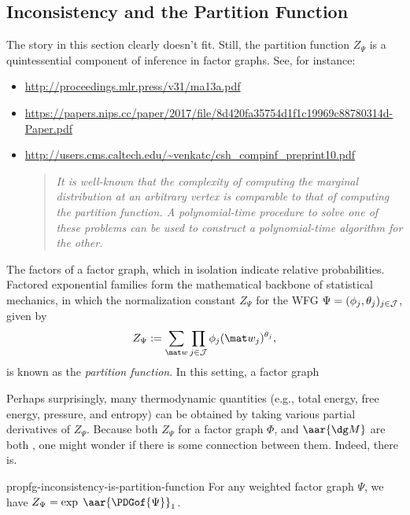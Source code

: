 \subsection{Inconsistency and the Partition Function}
\begin{storynote}
	The story in this section clearly doesn't fit. Still, the partition function $Z_\Psi$ is a quintessential component of inference in factor graphs. See, for instance:
	\begin{itemize}[nosep]
		\item \url{http://proceedings.mlr.press/v31/ma13a.pdf}
		\item {\small\url{https://papers.nips.cc/paper/2017/file/8d420fa35754d1f1c19969c88780314d-Paper.pdf}}
		\item \url{http://users.cms.caltech.edu/~venkatc/csh_compinf_preprint10.pdf}
		\begin{quotation} \small\it\noindent
			It is well-known that the complexity of computing the marginal distribution at an arbitrary vertex is comparable to that of computing the partition function. A polynomial-time procedure to solve one of these problems can be used to construct a polynomial-time algorithm for the other.
		\end{quotation}
	\end{itemize}
\end{storynote}

The factors of a factor graph, which in isolation indicate relative probabilities.
Factored exponential families form the mathematical backbone of statistical
mechanics, in which the normalization constant
$Z_{\Psi}$ for the WFG $\Psi = (\phi_j, \theta_j)_{j \in \cal J}$,
given by
$$
	Z_{\Psi} := \sum_{\mat w} \prod_{j \in \mathcal J} \phi_j(\mat w_j)^{\theta_j}
	,
$$
is known as the \emph{partition function}. In this setting, a factor graph

Perhaps surprisingly, many thermodynamic quantities
(e.g., total energy, free energy, pressure, and entropy) can
be obtained by taking various partial derivatives of $Z_\Psi$.
Because both $Z_{\Psi}$ for a factor graph $\Phi$, and $\aar{\dg M}$ are
both , one might wonder if there is some connection between them. Indeed, there is.

\begin{linked}{prop}{fg-inconsistency-is-partition-function}
	For any weighted factor graph $\Psi$, we have $Z_{\Psi} = \exp\; \aar{\PDGof{\Psi}}_1$.
\end{linked}




